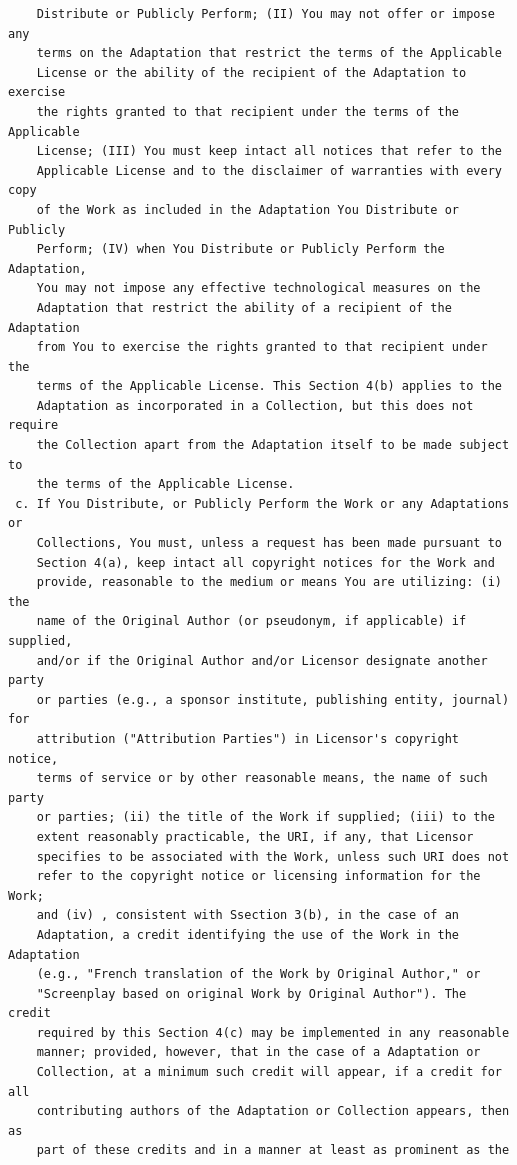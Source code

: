 \documentclass[10pt]{book}              %
\begin{document}
\begin{appendices}
\begin{verbatim}
    Distribute or Publicly Perform; (II) You may not offer or impose any
    terms on the Adaptation that restrict the terms of the Applicable
    License or the ability of the recipient of the Adaptation to exercise
    the rights granted to that recipient under the terms of the Applicable
    License; (III) You must keep intact all notices that refer to the
    Applicable License and to the disclaimer of warranties with every copy
    of the Work as included in the Adaptation You Distribute or Publicly
    Perform; (IV) when You Distribute or Publicly Perform the Adaptation,
    You may not impose any effective technological measures on the
    Adaptation that restrict the ability of a recipient of the Adaptation
    from You to exercise the rights granted to that recipient under the
    terms of the Applicable License. This Section 4(b) applies to the
    Adaptation as incorporated in a Collection, but this does not require
    the Collection apart from the Adaptation itself to be made subject to
    the terms of the Applicable License.
 c. If You Distribute, or Publicly Perform the Work or any Adaptations or
    Collections, You must, unless a request has been made pursuant to
    Section 4(a), keep intact all copyright notices for the Work and
    provide, reasonable to the medium or means You are utilizing: (i) the
    name of the Original Author (or pseudonym, if applicable) if supplied,
    and/or if the Original Author and/or Licensor designate another party
    or parties (e.g., a sponsor institute, publishing entity, journal) for
    attribution ("Attribution Parties") in Licensor's copyright notice,
    terms of service or by other reasonable means, the name of such party
    or parties; (ii) the title of the Work if supplied; (iii) to the
    extent reasonably practicable, the URI, if any, that Licensor
    specifies to be associated with the Work, unless such URI does not
    refer to the copyright notice or licensing information for the Work;
    and (iv) , consistent with Ssection 3(b), in the case of an
    Adaptation, a credit identifying the use of the Work in the Adaptation
    (e.g., "French translation of the Work by Original Author," or
    "Screenplay based on original Work by Original Author"). The credit
    required by this Section 4(c) may be implemented in any reasonable
    manner; provided, however, that in the case of a Adaptation or
    Collection, at a minimum such credit will appear, if a credit for all
    contributing authors of the Adaptation or Collection appears, then as
    part of these credits and in a manner at least as prominent as the

\end{verbatim}
\end{appendices}
\end{document}
